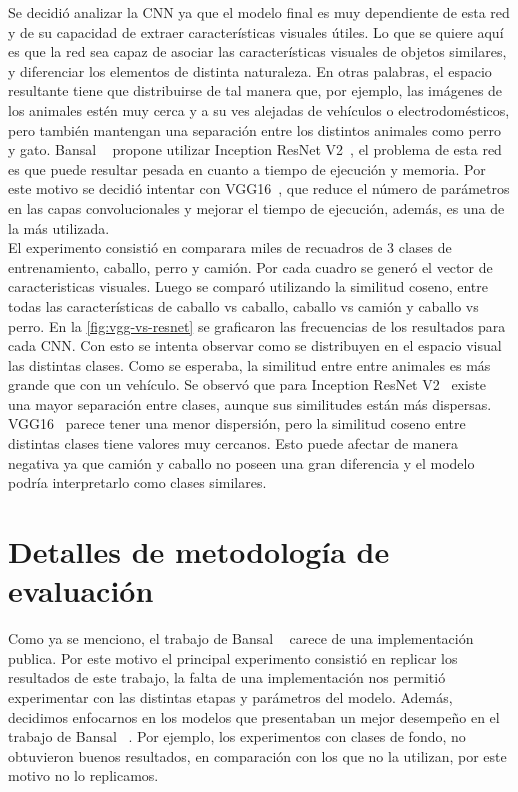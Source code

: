Se decidió analizar la CNN ya que el modelo final es muy dependiente de esta red y de su capacidad de extraer características visuales útiles. Lo que se quiere aquí es que la red sea capaz de asociar las características visuales de objetos similares, y diferenciar los elementos de distinta naturaleza. En otras palabras, el espacio resultante tiene que distribuirse de tal manera que, por ejemplo, las imágenes de los animales estén muy cerca y a su ves alejadas de vehículos o electrodomésticos, pero también mantengan una separación entre los distintos animales como perro y gato. Bansal \etal~\cite{bansal2018zero} propone utilizar Inception ResNet V2~\cite{resnet}, el problema de esta red es que puede resultar pesada en cuanto a tiempo de ejecución y memoria. Por este motivo se decidió intentar con VGG16~\cite{simonyan2014very}, que reduce el número de parámetros en las capas convolucionales y mejorar el tiempo de ejecución, además, es una de la más utilizada.\\

El experimento consistió en comparara miles de recuadros de 3 clases de entrenamiento, caballo, perro y camión.  Por cada cuadro se generó el vector de caracteristicas visuales. Luego se comparó utilizando la similitud coseno, entre todas las características de caballo vs caballo, caballo vs camión y caballo vs perro. En la \autoref{fig:vgg-vs-resnet} se graficaron las frecuencias de los resultados para cada CNN. Con esto se intenta observar como se distribuyen en el espacio visual las distintas clases. Como se esperaba, la similitud entre entre animales es más grande que con un vehículo. Se observó que para Inception ResNet V2~\cite{resnet} existe una mayor separación entre clases, aunque sus similitudes están más dispersas. VGG16~\cite{simonyan2014very} parece tener una menor dispersión, pero la similitud coseno entre distintas clases tiene valores muy cercanos. Esto puede afectar de manera negativa ya que camión y caballo no poseen una gran diferencia y el modelo podría interpretarlo como clases similares.\\


\section{Detalles de metodología de evaluación} \label{sec:detallesdemetodologiadeevaluacion}
Como ya se menciono, el trabajo de Bansal \etal~\cite{bansal2018zero} carece de una implementación publica. Por este motivo el principal experimento consistió en replicar los resultados de este trabajo, la falta de una implementación nos permitió experimentar con las distintas etapas y parámetros del modelo. Además, decidimos enfocarnos en los modelos que presentaban un mejor desempeño en el trabajo de Bansal \etal~\cite{bansal2018zero}. Por ejemplo, los experimentos con clases de fondo, no obtuvieron buenos resultados, en comparación con los que no la utilizan, por este motivo no lo replicamos.\\

